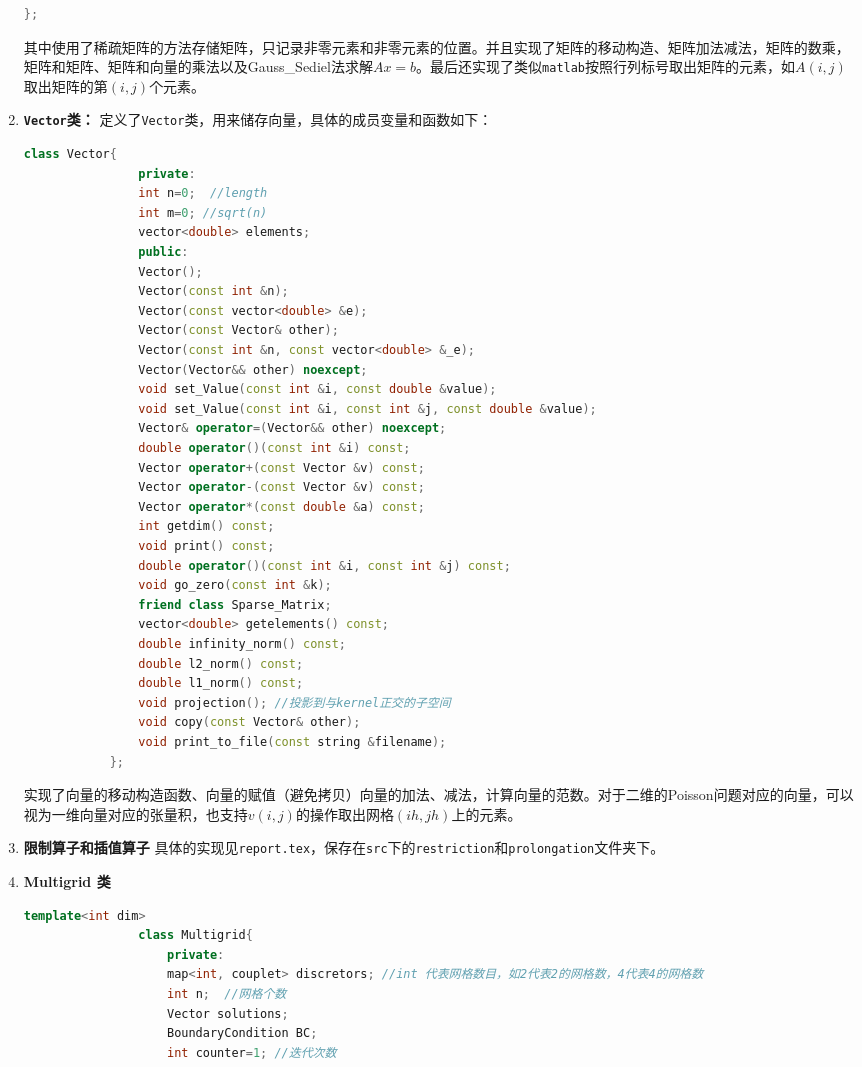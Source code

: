 \documentclass[UTF8]{ctexart}
\begin{document}
\begin{enumerate}
\begin{lstlisting}[language=C++, caption={运算符实现}, label={lst:operators}]
		};		
		\end{lstlisting}
		其中使用了稀疏矩阵的方法存储矩阵，只记录非零元素和非零元素的位置。并且实现了矩阵的移动构造、矩阵加法减法，矩阵的数乘，矩阵和矩阵、矩阵和向量的乘法以及Gauss\_Sediel法求解$Ax=b$。最后还实现了类似\texttt{matlab}按照行列标号取出矩阵的元素，如$A(i,j)$取出矩阵的第$(i, j)$个元素。
		\item  \textbf{\texttt{Vector}类：}	
		定义了\texttt{Vector}类，用来储存向量，具体的成员变量和函数如下：
		\begin{lstlisting}[language=C++, caption={运算符实现},
			 label={lst:operators}]
			class Vector{
				private:
				int n=0;  //length
				int m=0; //sqrt(n)
				vector<double> elements;
				public:
				Vector();
				Vector(const int &n);
				Vector(const vector<double> &e);
				Vector(const Vector& other);
				Vector(const int &n, const vector<double> &_e);
				Vector(Vector&& other) noexcept;
				void set_Value(const int &i, const double &value);
				void set_Value(const int &i, const int &j, const double &value);
				Vector& operator=(Vector&& other) noexcept;
				double operator()(const int &i) const;
				Vector operator+(const Vector &v) const;
				Vector operator-(const Vector &v) const;
				Vector operator*(const double &a) const;
				int getdim() const;
				void print() const;
				double operator()(const int &i, const int &j) const;
				void go_zero(const int &k);
				friend class Sparse_Matrix;
				vector<double> getelements() const;
				double infinity_norm() const;
				double l2_norm() const;
				double l1_norm() const;
				void projection(); //投影到与kernel正交的子空间
				void copy(const Vector& other);
				void print_to_file(const string &filename);
			};
		\end{lstlisting}
		实现了向量的移动构造函数、向量的赋值（避免拷贝）向量的加法、减法，计算向量的范数。对于二维的Poisson问题对应的向量，可以视为一维向量对应的张量积，也支持$v(i,j)$的操作取出网格$(ih,jh)$上的元素。
		\item \textbf{限制算子和插值算子}
		具体的实现见\texttt{report.tex}，保存在\texttt{src}下的\texttt{restriction}和\texttt{prolongation}文件夹下。
		\item  \textbf{ Multigrid 类}
		\begin{lstlisting}[language=C++, caption={运算符实现},
			label={lst:operators}]
				template<int dim>
				class Multigrid{
					private:
					map<int, couplet> discretors; //int 代表网格数目，如2代表2的网格数，4代表4的网格数 
					int n;  //网格个数
					Vector solutions;
					BoundaryCondition BC;
					int counter=1; //迭代次数 

\end{lstlisting}
\end{enumerate}
\end{document}
